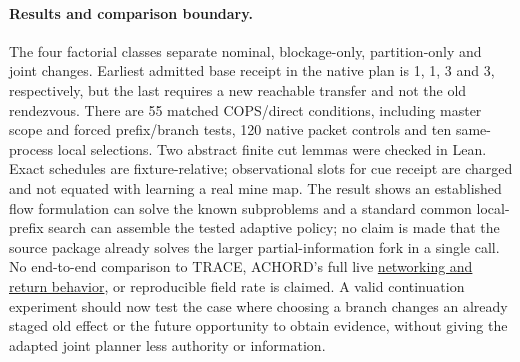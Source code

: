 \documentclass[11pt]{article}
\begin{document}
\paragraph{Results and comparison boundary.}
The four factorial classes separate nominal, blockage-only,
partition-only and joint changes. Earliest admitted base receipt
in the native plan is 1, 1, 3 and 3, respectively, but the
last requires a new reachable transfer and not the old rendezvous.
There are 55 matched COPS/direct conditions, including master
scope and forced prefix/branch tests, 120 native packet controls
and ten same-process local selections. Two abstract finite cut
lemmas were checked in Lean. Exact schedules are fixture-relative;
observational slots for cue receipt are charged and not equated with
learning a real mine map. The result shows an established flow
formulation can solve the known subproblems and a standard common
local-prefix search can assemble the tested adaptive policy; no
claim is made that the source package already solves the larger
partial-information fork in a single call.
No end-to-end comparison to TRACE, ACHORD's full live
\href{https://lillyclark.github.io/files/ACHORD_RA_L_IROS_.pdf}{networking
and return behavior}, or reproducible field rate is claimed.
A valid continuation experiment should now test the case where
choosing a branch changes an already staged old effect or the
future opportunity to obtain evidence, without giving the adapted
joint planner less authority or information.
\end{document}
